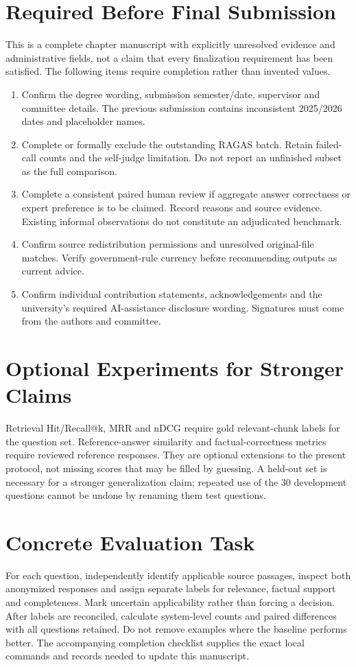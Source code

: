 \section{Required Before Final Submission}
This is a complete chapter manuscript with explicitly unresolved evidence and administrative fields, not a claim that every finalization requirement has been satisfied. The following items require completion rather than invented values.
\begin{enumerate}
\item Confirm the degree wording, submission semester/date, supervisor and committee details. The previous submission contains inconsistent 2025/2026 dates and placeholder names.
\item Complete or formally exclude the outstanding RAGAS batch. Retain failed-call counts and the self-judge limitation. Do not report an unfinished subset as the full comparison.
\item Complete a consistent paired human review if aggregate answer correctness or expert preference is to be claimed. Record reasons and source evidence. Existing informal observations do not constitute an adjudicated benchmark.
\item Confirm source redistribution permissions and unresolved original-file matches. Verify government-rule currency before recommending outputs as current advice.
\item Confirm individual contribution statements, acknowledgements and the university's required AI-assistance disclosure wording. Signatures must come from the authors and committee.
\end{enumerate}

\section{Optional Experiments for Stronger Claims}
Retrieval Hit/Recall@k, MRR and nDCG require gold relevant-chunk labels for the question set. Reference-answer similarity and factual-correctness metrics require reviewed reference responses. They are optional extensions to the present protocol, not missing scores that may be filled by guessing. A held-out set is necessary for a stronger generalization claim; repeated use of the 30 development questions cannot be undone by renaming them test questions.

\section{Concrete Evaluation Task}
For each question, independently identify applicable source passages, inspect both anonymized responses and assign separate labels for relevance, factual support and completeness. Mark uncertain applicability rather than forcing a decision. After labels are reconciled, calculate system-level counts and paired differences with all questions retained. Do not remove examples where the baseline performs better. The accompanying completion checklist supplies the exact local commands and records needed to update this manuscript.

